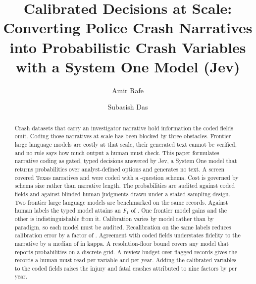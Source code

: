 \documentclass[a4paper,fleqn]{cas-sc}
\begin{document}
\let\WriteBookmarks\relax


\title[mode=title]{Calibrated Decisions at Scale: Converting Police Crash Narratives into
Probabilistic Crash Variables with a System One Model (Jev)}

\author[1]{Amir Rafe}
\cormark[1]

\author[1]{Subasish Das}



\begin{abstract}
Crash datasets that carry an investigator narrative hold information the coded fields omit.
Coding those narratives at scale has been blocked by three obstacles. Frontier large language
models are costly at that scale, their generated text cannot be verified, and no rule says how
much output a human must check. This paper formulates narrative coding as gated, typed
decisions answered by Jev, a System One model that returns probabilities over analyst-defined
options and generates no text. A screen covered \StageOneCoded{} Texas narratives and
\NstageTwo{} were coded with a \NQuestions{}-question schema. Cost is governed by schema size
rather than narrative length. The probabilities are audited against
coded fields and against \GoldNUsable{} blinded human judgments drawn under a stated sampling
design. Two frontier large language models are benchmarked on the same records. Against human
labels the typed model attains an $F_1$ of \GoldFone{}. One frontier model gains
\DiffJevFable{} and the other is indistinguishable from it. Calibration varies by model rather
than by paradigm, so each model must be audited. Recalibration on the same labels reduces
calibration error by a factor of \RecalIsoGain{}. Agreement with coded fields understates
fidelity to the narrative by a median of \KappaGapMedian{} in kappa. A resolution-floor bound
covers any model that reports probabilities on a discrete grid. A review budget over flagged
records gives the records a human must read per variable and per year. Adding the calibrated
variables to the coded fields raises the injury and fatal crashes attributed to nine factors by
\DownAddedTotal{} per year.
\end{abstract}
\end{document}
